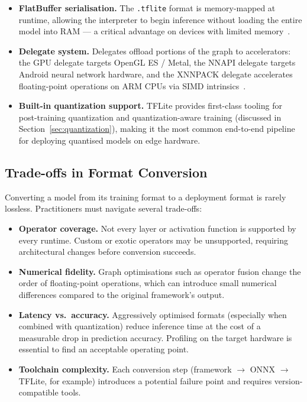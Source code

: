 \begin{itemize}
    \item \textbf{FlatBuffer serialisation.} The \texttt{.tflite}
          format is memory-mapped at runtime, allowing the interpreter
          to begin inference without loading the entire model into
          RAM — a critical advantage on devices with limited
          memory~\cite{david2021tensorflow}.
 
    \item \textbf{Delegate system.} Delegates offload portions of the
          graph to accelerators: the GPU delegate targets OpenGL ES /
          Metal, the NNAPI delegate targets Android neural network
          hardware, and the XNNPACK delegate accelerates
          floating-point operations on ARM CPUs via SIMD
          intrinsics~\cite{xnnpack2020}.
 
    \item \textbf{Built-in quantization support.} TFLite provides
          first-class tooling for post-training quantization and
          quantization-aware training (discussed in
          Section~\ref{sec:quantization}), making it the most common
          end-to-end pipeline for deploying quantised models on
          edge hardware.
\end{itemize}
 
\subsection{Trade-offs in Format Conversion}
 
Converting a model from its training format to a deployment format is
rarely lossless. Practitioners must navigate several trade-offs:
 
\begin{itemize}
    \item \textbf{Operator coverage.} Not every layer or activation
          function is supported by every runtime. Custom or exotic
          operators may be unsupported, requiring architectural
          changes before conversion succeeds.
 
    \item \textbf{Numerical fidelity.} Graph optimisations such as
          operator fusion change the order of floating-point
          operations, which can introduce small numerical differences
          compared to the original framework's output.
 
    \item \textbf{Latency vs.\ accuracy.} Aggressively optimised
          formats (especially when combined with quantization) reduce
          inference time at the cost of a measurable drop in
          prediction accuracy. Profiling on the target hardware is
          essential to find an acceptable operating point.
 
    \item \textbf{Toolchain complexity.} Each conversion step
          (framework $\to$ ONNX $\to$ TFLite, for example) introduces
          a potential failure point and requires version-compatible
          tools.
\end{itemize}
 
